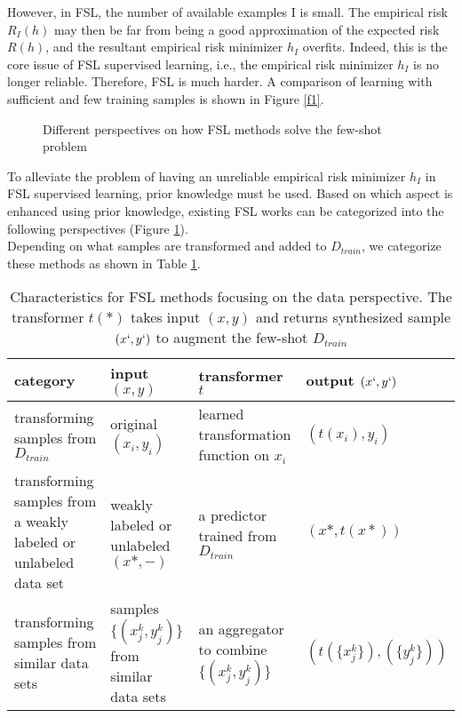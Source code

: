 \documentclass[12pt]{informs4}
\begin{document}
However, in FSL, the number of available examples I is small. The empirical risk $R_I(h)$ may then be far from being a good approximation of the expected risk $R(h)$, and the resultant empirical risk minimizer $h_I$ overfits. Indeed, this is the core issue of FSL supervised learning, i.e., the empirical risk minimizer $h_I$ is no longer reliable. Therefore, FSL is much harder. A comparison of learning with sufficient and few training samples is shown in Figure \ref{f1}.\\
\begin{figure}[H]
\caption{Different perspectives on how FSL methods solve the few-shot problem}
\label{f2}
\end{figure}

To alleviate the problem of having an unreliable empirical risk minimizer $h_I$ in FSL supervised learning, prior knowledge must be used. Based on which aspect is enhanced using prior knowledge, existing FSL works can be categorized into the following perspectives (Figure \ref{f2}).\\

Depending on what samples are transformed and added to $D_{train}$, we categorize these methods as shown in Table \ref{t1}.\\

\begin{table}[H]
\caption{Characteristics for FSL methods focusing on the data perspective. The transformer $t(*)$ takes input $(x, y)$ and returns synthesized sample $(x`, y`)$ to augment the few-shot $D_{train}$}
\begin{tabular}{|p{3cm}|p{3cm}|p{3cm}|p{3cm}|}
\hline
category & input $(x,y)$ & transformer $t$ & output $(x`, y`)$\\
\hline
transforming samples from $D_{train}$ & original $(x_i, y_i)$ & learned transformation function on $x_i$ & $(t(x_i), y_i)$\\
\hline
transforming samples from a weakly labeled or unlabeled data set & weakly labeled or unlabeled $(x*, -)$ &  a predictor trained from $D_{train}$ & $(x*, t(x*))$\\
\hline
transforming samples from similar data sets & samples $\{(x_j^k, y_j^k)\}$ from similar data sets & an aggregator to combine $\{(x_j^k, y_j^k)\}$ & $(t(\{x_j^k\}), (\{y_j^k\}))$\\
\hline
\end{tabular}
\label{t1}
\end{table}
\end{document}
